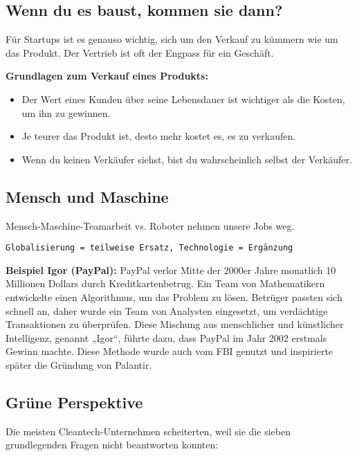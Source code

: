 \documentclass[10pt]{article}
\begin{document}
\subsection{Wenn du es baust, kommen sie dann?}

Für Startups ist es genauso wichtig, sich um den Verkauf zu kümmern wie um das Produkt. Der Vertrieb ist oft der Engpass für ein Geschäft.

\clearpage

\textbf{Grundlagen zum Verkauf eines Produkts:}

\begin{itemize}
\item Der Wert eines Kunden über seine Lebensdauer ist wichtiger als die Kosten, um ihn zu gewinnen.
\item Je teurer das Produkt ist, desto mehr kostet es, es zu verkaufen.
\item Wenn du keinen Verkäufer siehst, bist du wahrscheinlich selbst der Verkäufer.
\end{itemize}

\subsection{Mensch und Maschine}

Mensch-Maschine-Teamarbeit vs. Roboter nehmen unsere Jobs weg.

\begin{center}
\texttt{Globalisierung = teilweise Ersatz, Technologie = Ergänzung}
\end{center}

\textbf{Beispiel Igor (PayPal):}
PayPal verlor Mitte der 2000er Jahre monatlich 10 Millionen Dollars durch Kreditkartenbetrug.
Ein Team von Mathematikern entwickelte einen Algorithmus, um das Problem zu lösen.
Betrüger passten sich schnell an, daher wurde ein Team von Analysten eingesetzt, um verdächtige Transaktionen zu überprüfen.
Diese Mischung aus menschlicher und künstlicher Intelligenz, genannt „Igor“, führte dazu, dass PayPal im Jahr 2002 erstmals Gewinn machte.
Diese Methode wurde auch vom FBI genutzt und inspirierte später die Gründung von Palantir.

\subsection{Grüne Perspektive}

Die meisten Cleantech-Unternehmen scheiterten, weil sie die sieben grundlegenden Fragen nicht beantworten konnten:
\end{document}
